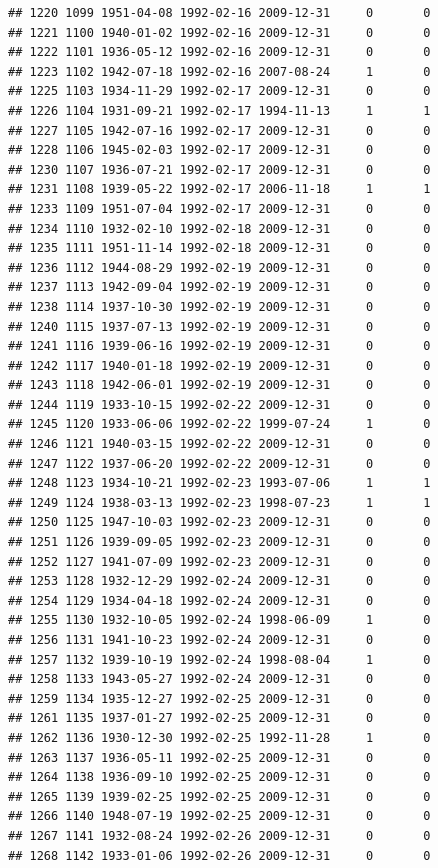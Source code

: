 \documentclass[
]{book}
\begin{document}
\begin{verbatim}
## 1220 1099 1951-04-08 1992-02-16 2009-12-31     0       0
## 1221 1100 1940-01-02 1992-02-16 2009-12-31     0       0
## 1222 1101 1936-05-12 1992-02-16 2009-12-31     0       0
## 1223 1102 1942-07-18 1992-02-16 2007-08-24     1       0
## 1225 1103 1934-11-29 1992-02-17 2009-12-31     0       0
## 1226 1104 1931-09-21 1992-02-17 1994-11-13     1       1
## 1227 1105 1942-07-16 1992-02-17 2009-12-31     0       0
## 1228 1106 1945-02-03 1992-02-17 2009-12-31     0       0
## 1230 1107 1936-07-21 1992-02-17 2009-12-31     0       0
## 1231 1108 1939-05-22 1992-02-17 2006-11-18     1       1
## 1233 1109 1951-07-04 1992-02-17 2009-12-31     0       0
## 1234 1110 1932-02-10 1992-02-18 2009-12-31     0       0
## 1235 1111 1951-11-14 1992-02-18 2009-12-31     0       0
## 1236 1112 1944-08-29 1992-02-19 2009-12-31     0       0
## 1237 1113 1942-09-04 1992-02-19 2009-12-31     0       0
## 1238 1114 1937-10-30 1992-02-19 2009-12-31     0       0
## 1240 1115 1937-07-13 1992-02-19 2009-12-31     0       0
## 1241 1116 1939-06-16 1992-02-19 2009-12-31     0       0
## 1242 1117 1940-01-18 1992-02-19 2009-12-31     0       0
## 1243 1118 1942-06-01 1992-02-19 2009-12-31     0       0
## 1244 1119 1933-10-15 1992-02-22 2009-12-31     0       0
## 1245 1120 1933-06-06 1992-02-22 1999-07-24     1       0
## 1246 1121 1940-03-15 1992-02-22 2009-12-31     0       0
## 1247 1122 1937-06-20 1992-02-22 2009-12-31     0       0
## 1248 1123 1934-10-21 1992-02-23 1993-07-06     1       1
## 1249 1124 1938-03-13 1992-02-23 1998-07-23     1       1
## 1250 1125 1947-10-03 1992-02-23 2009-12-31     0       0
## 1251 1126 1939-09-05 1992-02-23 2009-12-31     0       0
## 1252 1127 1941-07-09 1992-02-23 2009-12-31     0       0
## 1253 1128 1932-12-29 1992-02-24 2009-12-31     0       0
## 1254 1129 1934-04-18 1992-02-24 2009-12-31     0       0
## 1255 1130 1932-10-05 1992-02-24 1998-06-09     1       0
## 1256 1131 1941-10-23 1992-02-24 2009-12-31     0       0
## 1257 1132 1939-10-19 1992-02-24 1998-08-04     1       0
## 1258 1133 1943-05-27 1992-02-24 2009-12-31     0       0
## 1259 1134 1935-12-27 1992-02-25 2009-12-31     0       0
## 1261 1135 1937-01-27 1992-02-25 2009-12-31     0       0
## 1262 1136 1930-12-30 1992-02-25 1992-11-28     1       0
## 1263 1137 1936-05-11 1992-02-25 2009-12-31     0       0
## 1264 1138 1936-09-10 1992-02-25 2009-12-31     0       0
## 1265 1139 1939-02-25 1992-02-25 2009-12-31     0       0
## 1266 1140 1948-07-19 1992-02-25 2009-12-31     0       0
## 1267 1141 1932-08-24 1992-02-26 2009-12-31     0       0
## 1268 1142 1933-01-06 1992-02-26 2009-12-31     0       0

\end{verbatim}
\end{document}

